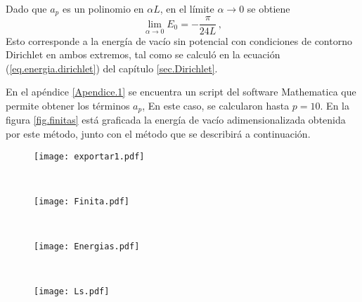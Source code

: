 Dado que $a _p$ es un polinomio en $\alpha L$, en el límite $\alpha \rightarrow 0$ se obtiene
\begin{equation}
\lim \limits_{\alpha \rightarrow 0} E _0 = 
		- \frac{\pi}{24 L}
\, ,
\end{equation}
Esto corresponde a la energía de vacío sin potencial con condiciones de contorno Dirichlet en ambos extremos, tal como se calculó en la ecuación (\ref{eq.energia.dirichlet}) del capítulo \ref{sec.Dirichlet}.

En el apéndice \ref{Apendice.1} se encuentra un script del software Mathematica que permite obtener los términos $a _p$, En este caso, se calcularon hasta $p=10$. En la figura \ref{fig.finitas} está graficada la energía de vacío adimensionalizada obtenida por este método, junto con el método que se describirá a continuación.



\begin{figure*}[t!]
    \centering
    \begin{subfigure}[t]{0.5\textwidth}
        \centering
        \texttt{[image: exportar1.pdf]}
        \caption{}
        \label{fig.derecha}
    \end{subfigure}%
    ~ 
    \begin{subfigure}[t]{0.5\textwidth}
        \centering
        \texttt{[image: Finita.pdf]}
        \caption{}
        \label{fig.izquierda}
    \end{subfigure}
    ~
    \caption{En esta imagen se muestran dos posibles adimensionalizaciones de la energía de vacío, una vez obtenida la curva \ref{fig.izquierda} se pueden generar todas las curvas de la figura \ref{fig:vacios}, haciendo los cambios de variables $\beta \rightarrow \alpha L$, $E _0 \rightarrow \frac{E _0}{\alpha}$.}
\label{fig.finitas}
\end{figure*}

\begin{figure*}[t!]
    \centering
    \begin{subfigure}[t]{0.5\textwidth}
        \centering
        \texttt{[image: Energias.pdf]}
        \caption{}
        \label{fig.izquierda123}
    \end{subfigure}%
    ~ 
    \begin{subfigure}[t]{0.5\textwidth}
        \centering
        \texttt{[image: Ls.pdf]}
        \caption{}
    \end{subfigure}
    \caption{En esta imagen se puede observar la dependencia de la energía de Casimir $E _0$ para distintos valores de $\alpha$ y $L$, puede verse en \ref{fig.izquierda123}, que a medida que incrementa $\alpha$, la energía de vacío posee un máximo local más abrupto.}
\label{fig:vacios}
\end{figure*}

